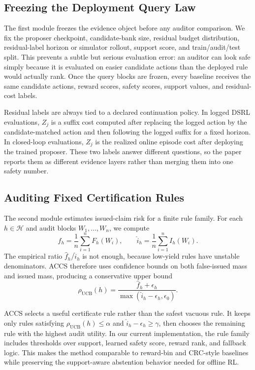 \documentclass[letterpaper]{article}
\begin{document}
\subsection{Freezing the Deployment Query Law}

The first module freezes the evidence object before any auditor comparison. We
fix the proposer checkpoint, candidate-bank size, residual budget distribution,
residual-label horizon or simulator rollout, support score, and train/audit/test
split. This prevents a subtle but serious evaluation error: an auditor can look
safe simply because it is evaluated on easier candidate actions than the
deployed rule would actually rank. Once the query blocks are frozen, every
baseline receives the same candidate actions, reward scores, safety scores,
support values, and residual-cost labels.

Residual labels are always tied to a declared continuation policy. In logged
DSRL evaluations, $Z_j$ is a suffix cost computed after replacing the logged
action by the candidate-matched action and then following the logged suffix for
a fixed horizon. In closed-loop evaluations, $Z_j$ is the realized online
episode cost after deploying the trained proposer. These two labels answer
different questions, so the paper reports them as different evidence layers
rather than merging them into one safety number.

\subsection{Auditing Fixed Certification Rules}

The second module estimates issued-claim risk for a finite rule family. For
each $h\in\mathcal{H}$ and audit blocks $W_1,\ldots,W_n$, we compute
\[
\widehat f_h=\frac{1}{n}\sum_{i=1}^n F_h(W_i), \qquad
\widehat i_h=\frac{1}{n}\sum_{i=1}^n I_h(W_i).
\]
The empirical ratio $\widehat f_h/\widehat i_h$ is not enough, because low-yield
rules have unstable denominators. ACCS therefore uses confidence bounds on
both false-issued mass and issued mass, producing a conservative upper bound
\[
\rho_{\mathrm{UCB}}(h)=
\frac{\widehat f_h+\epsilon_h}{\max(\widehat i_h-\epsilon_h,\epsilon_0)}.
\]

ACCS selects a useful certificate rule rather than the safest vacuous rule. It
keeps only rules satisfying
$\rho_{\mathrm{UCB}}(h)\le \alpha$ and
$\widehat i_h-\epsilon_h\ge \gamma$, then chooses the remaining rule with the
highest audit utility. In our current implementation, the rule family includes
thresholds over support, learned safety score, reward rank, and fallback logic.
This makes the method comparable to reward-bin and CRC-style baselines while
preserving the support-aware abstention behavior needed for offline RL.
\end{document}
